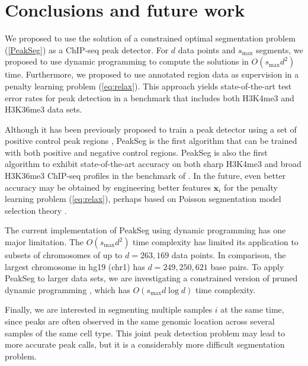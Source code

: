 \documentclass{article}
\begin{document}
\section{Conclusions and future work}
\label{sec:conclusions}

We proposed to use the solution of a constrained optimal segmentation
problem (\ref{PeakSeg}) as a ChIP-seq peak detector. For
$d$ data points and $s_{\text{max}}$ segments, we proposed to use
dynamic programming to compute the solutions in $O(s_{\text{max}} d^2)$
time. Furthermore, we proposed to use annotated region data as
supervision in a penalty learning problem (\ref{eq:relax}). This
approach yields state-of-the-art test error rates for peak detection
in a benchmark that includes both H3K4me3 and H3K36me3 data
sets.

Although it has been previously proposed to train a peak detector
using a set of positive control peak regions \citep{DFilter}, PeakSeg
is the first algorithm that can be trained with both positive and
negative control regions. PeakSeg is also the first algorithm to
exhibit state-of-the-art accuracy on both sharp H3K4me3 and broad
H3K36me3 ChIP-seq profiles in the benchmark of
\citet{hocking2014visual}. In the future, even better accuracy may be
obtained by engineering better features $\mathbf x_i$ for the penalty
learning problem (\ref{eq:relax}), perhaps based on Poisson
segmentation model selection theory \citep{cleynen2013segmentation}.

The current implementation of PeakSeg using dynamic programming has
one major limitation. The $O(s_{\text{max}} d^2)$ time complexity has
limited its application to subsets of chromosomes of up to $d=263,169$
data points. In comparison, the largest chromosome in hg19 (chr1) has
$d=249,250,621$ base pairs. To apply PeakSeg to larger data sets, we
are investigating a constrained version of pruned dynamic programming
\citep{pruned-dp, Segmentor}, which has $O(s_{\text{max}} d\log d)$
time complexity.

Finally, we are interested in segmenting multiple samples $i$ at the
same time, since peaks are often observed in the same genomic location
across several samples of the same cell type. This joint peak
detection problem may lead to more accurate peak calls, but it is a
considerably more difficult segmentation problem.
\end{document}
